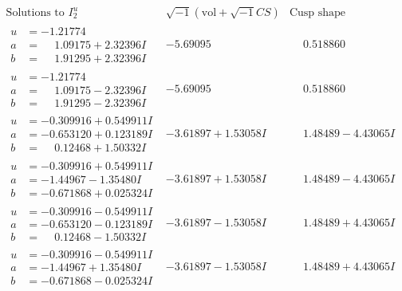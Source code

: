 \documentclass[1p]{elsarticle_modified}
\theoremstyle{definition}
\newcommand{\I}{\sqrt{-1}}
\begin{document}
$$\begin{array}{c|c|c}  
\text{Solutions to }I^u_{2}& \I (\text{vol} + \sqrt{-1}CS) & \text{Cusp shape}\\
 \hline 
\begin{aligned}
u &= -1.21774\phantom{ +0.000000I} \\
a &= \phantom{-}1.09175 + 2.32396 I \\
b &= \phantom{-}1.91295 + 2.32396 I\end{aligned}
 & -5.69095\phantom{ +0.000000I} & \phantom{-}0.518860\phantom{ +0.000000I} \\ \hline\begin{aligned}
u &= -1.21774\phantom{ +0.000000I} \\
a &= \phantom{-}1.09175 - 2.32396 I \\
b &= \phantom{-}1.91295 - 2.32396 I\end{aligned}
 & -5.69095\phantom{ +0.000000I} & \phantom{-}0.518860\phantom{ +0.000000I} \\ \hline\begin{aligned}
u &= -0.309916 + 0.549911 I \\
a &= -0.653120 + 0.123189 I \\
b &= \phantom{-}0.12468 + 1.50332 I\end{aligned}
 & -3.61897 + 1.53058 I & \phantom{-}1.48489 - 4.43065 I \\ \hline\begin{aligned}
u &= -0.309916 + 0.549911 I \\
a &= -1.44967 - 1.35480 I \\
b &= -0.671868 + 0.025324 I\end{aligned}
 & -3.61897 + 1.53058 I & \phantom{-}1.48489 - 4.43065 I \\ \hline\begin{aligned}
u &= -0.309916 - 0.549911 I \\
a &= -0.653120 - 0.123189 I \\
b &= \phantom{-}0.12468 - 1.50332 I\end{aligned}
 & -3.61897 - 1.53058 I & \phantom{-}1.48489 + 4.43065 I \\ \hline\begin{aligned}
u &= -0.309916 - 0.549911 I \\
a &= -1.44967 + 1.35480 I \\
b &= -0.671868 - 0.025324 I\end{aligned}
 & -3.61897 - 1.53058 I & \phantom{-}1.48489 + 4.43065 I \\ \hline\begin{aligned}

\end{aligned}
\end{array}$$
\end{document}
